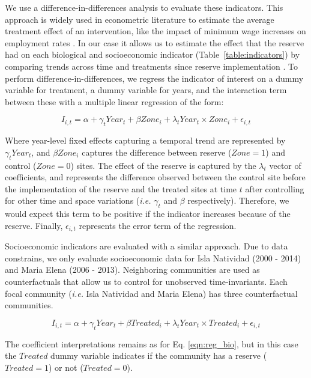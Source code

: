 \documentclass[10pt,letterpaper]{article}
\begin{document}
We use a difference-in-differences analysis to evaluate these indicators. This approach is widely used in econometric literature to estimate the average treatment effect of an intervention, like the impact of minimum wage increases on employment rates \cite{card_1994}. In our case it allows us to estimate the effect that the reserve had on each biological and socioeconomic indicator (Table~\ref{table:indicators}) by comparing trends across time and treatments since reserve implementation \cite{moland_2013,Villasenor-Derbez_2018, kerr_2019}. To perform difference-in-differences, we regress the indicator of interest on a dummy variable for treatment, a dummy variable for years, and the interaction term between these with a multiple linear regression of the form:

\begin{equation}
I_{i,t} = \alpha + \gamma_{t} Year_t + \beta Zone_i + \lambda_{t} Year_t\times Zone_i + \epsilon_{i,t}
\label{eqn:reg_bio}
\end{equation}

Where year-level fixed effects capturing a temporal trend are represented by $\gamma_t Year_t$, and $\beta Zone_i$ captures the difference between reserve ($Zone = 1$) and control ($Zone = 0$) sites. The effect of the reserve is captured by the $\lambda_t$ vector of coefficients, and represents the difference observed between the control site before the implementation of the reserve and the treated sites at time $t$ after controlling for other time and space variations (\emph{i.e.} $\gamma_t$ and $\beta$ respectively). Therefore, we would expect this term to be positive if the indicator increases because of the reserve. Finally, $\epsilon_{i,t}$ represents the error term of the regression.

Socioeconomic indicators are evaluated with a similar approach. Due to data constrains, we only evaluate socioeconomic data for Isla Natividad (2000 - 2014) and Maria Elena (2006 - 2013). Neighboring communities are used as counterfactuals that allow us to control for unobserved time-invariants. Each focal community (\emph{i.e.} Isla Natividad and Maria Elena) has three counterfactual communities.

\begin{equation}
I_{i,t} = \alpha + \gamma_{t} Year_t + \beta Treated_i + \lambda_{t} Year_t\times Treated_i +\epsilon_{i,t}
\label{eqn:soc_reg}
\end{equation}

The coefficient interpretations remains as for Eq. \ref{eqn:reg_bio}, but in this case the $Treated$ dummy variable indicates if the community has a reserve ($Treated = 1$) or not ($Treated = 0$).
\end{document}
